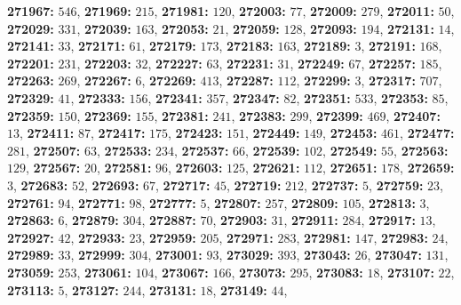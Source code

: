 \textsf{\bfseries 271967:} $546$, \textsf{\bfseries 271969:} $215$, \textsf{\bfseries 271981:} $120$, \textsf{\bfseries 272003:} $77$, \textsf{\bfseries 272009:} $279$, \textsf{\bfseries 272011:} $50$, \textsf{\bfseries 272029:} $331$, \textsf{\bfseries 272039:} $163$, \textsf{\bfseries 272053:} $21$, \textsf{\bfseries 272059:} $128$, \textsf{\bfseries 272093:} $194$, \textsf{\bfseries 272131:} $14$, \textsf{\bfseries 272141:} $33$, \textsf{\bfseries 272171:} $61$, \textsf{\bfseries 272179:} $173$, \textsf{\bfseries 272183:} $163$, \textsf{\bfseries 272189:} $3$, \textsf{\bfseries 272191:} $168$, \textsf{\bfseries 272201:} $231$, \textsf{\bfseries 272203:} $32$, \textsf{\bfseries 272227:} $63$, \textsf{\bfseries 272231:} $31$, \textsf{\bfseries 272249:} $67$, \textsf{\bfseries 272257:} $185$, \textsf{\bfseries 272263:} $269$, \textsf{\bfseries 272267:} $6$, \textsf{\bfseries 272269:} $413$, \textsf{\bfseries 272287:} $112$, \textsf{\bfseries 272299:} $3$, \textsf{\bfseries 272317:} $707$, \textsf{\bfseries 272329:} $41$, \textsf{\bfseries 272333:} $156$, \textsf{\bfseries 272341:} $357$, \textsf{\bfseries 272347:} $82$, \textsf{\bfseries 272351:} $533$, \textsf{\bfseries 272353:} $85$, \textsf{\bfseries 272359:} $150$, \textsf{\bfseries 272369:} $155$, \textsf{\bfseries 272381:} $241$, \textsf{\bfseries 272383:} $299$, \textsf{\bfseries 272399:} $469$, \textsf{\bfseries 272407:} $13$, \textsf{\bfseries 272411:} $87$, \textsf{\bfseries 272417:} $175$, \textsf{\bfseries 272423:} $151$, \textsf{\bfseries 272449:} $149$, \textsf{\bfseries 272453:} $461$, \textsf{\bfseries 272477:} $281$, \textsf{\bfseries 272507:} $63$, \textsf{\bfseries 272533:} $234$, \textsf{\bfseries 272537:} $66$, \textsf{\bfseries 272539:} $102$, \textsf{\bfseries 272549:} $55$, \textsf{\bfseries 272563:} $129$, \textsf{\bfseries 272567:} $20$, \textsf{\bfseries 272581:} $96$, \textsf{\bfseries 272603:} $125$, \textsf{\bfseries 272621:} $112$, \textsf{\bfseries 272651:} $178$, \textsf{\bfseries 272659:} $3$, \textsf{\bfseries 272683:} $52$, \textsf{\bfseries 272693:} $67$, \textsf{\bfseries 272717:} $45$, \textsf{\bfseries 272719:} $212$, \textsf{\bfseries 272737:} $5$, \textsf{\bfseries 272759:} $23$, \textsf{\bfseries 272761:} $94$, \textsf{\bfseries 272771:} $98$, \textsf{\bfseries 272777:} $5$, \textsf{\bfseries 272807:} $257$, \textsf{\bfseries 272809:} $105$, \textsf{\bfseries 272813:} $3$, \textsf{\bfseries 272863:} $6$, \textsf{\bfseries 272879:} $304$, \textsf{\bfseries 272887:} $70$, \textsf{\bfseries 272903:} $31$, \textsf{\bfseries 272911:} $284$, \textsf{\bfseries 272917:} $13$, \textsf{\bfseries 272927:} $42$, \textsf{\bfseries 272933:} $23$, \textsf{\bfseries 272959:} $205$, \textsf{\bfseries 272971:} $283$, \textsf{\bfseries 272981:} $147$, \textsf{\bfseries 272983:} $24$, \textsf{\bfseries 272989:} $33$, \textsf{\bfseries 272999:} $304$, \textsf{\bfseries 273001:} $93$, \textsf{\bfseries 273029:} $393$, \textsf{\bfseries 273043:} $26$, \textsf{\bfseries 273047:} $131$, \textsf{\bfseries 273059:} $253$, \textsf{\bfseries 273061:} $104$, \textsf{\bfseries 273067:} $166$, \textsf{\bfseries 273073:} $295$, \textsf{\bfseries 273083:} $18$, \textsf{\bfseries 273107:} $22$, \textsf{\bfseries 273113:} $5$, \textsf{\bfseries 273127:} $244$, \textsf{\bfseries 273131:} $18$, \textsf{\bfseries 273149:} $44$, 
